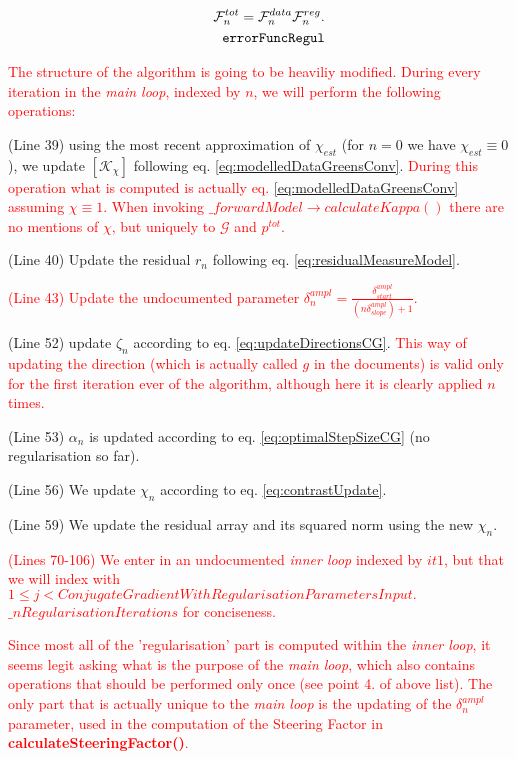 \documentclass[10pt,a4paper]{article}
\begin{document}
\begin{align} \label{eq:errorFuncRegul} \mathcal{F}^{tot}_n =
\mathcal{F}^{data}_n \mathcal{F}^{reg}_n.\\
\tag*{\texttt{errorFuncRegul}}
\end{align}

\textcolor{red}{The structure of the algorithm is going to be heaviliy modified.
During every iteration in the \textit{main loop}, indexed by $n$, we will perform the following operations:}
\begin{enumerate}
\item (Line 39) using the most recent approximation of $\chi_{est} $ (for $n=0$ we have $\chi_{est} \equiv 0$), we update $[\mathcal{K}_\chi]$ following eq. \eqref{eq:modelledDataGreensConv}. 
\textcolor{red}{During this operation what is computed is actually eq. \eqref{eq:modelledDataGreensConv} assuming $\chi \equiv 1$. When invoking $\_forwardModel\rightarrow calculateKappa()$ there are no mentions of $\chi$, but uniquely to $\mathcal{G}$ and $p^{tot}$.
}
\item (Line 40) Update the residual $r_n$ following eq. \eqref{eq:residualMeasureModel}.
\textcolor{red}{\item (Line 43) Update the undocumented parameter $\delta^{ampl}_n = \frac{\delta^{ampl}_{start}}{(n  \delta^{ampl}_{slope}) +1}$.}
\item (Line 52) update $\zeta_n$ according to eq. \eqref{eq:updateDirectionsCG}. 
\textcolor{red}{This way of updating the direction (which is actually called $g$ in the documents) is valid only for the first iteration ever of the algorithm, although here it is clearly applied $n$ times.}
\item (Line 53)  $\alpha_n$ is updated according to eq. \eqref{eq:optimalStepSizeCG} (no regularisation so far).
\item (Line 56) We update $\chi_n$ according to eq. \eqref{eq:contrastUpdate}.
\item (Line 59) We update the residual array and its squared norm using the new $\chi_n$.
\textcolor{red}{\item (Lines 70-106) We enter in an undocumented \textit{inner loop} indexed by $it1$, but that we will index with $1\leq j <  ConjugateGradientWithRegularisationParametersInput.$ $ \_nRegularisationIterations$ for conciseness.}
\end{enumerate}
\textcolor{red}{
Since most all of the 'regularisation' part is computed within the \textit{inner loop}, it seems legit asking what is the purpose of the \textit{main loop}, which also contains operations that should be performed only once (see point 4. of above list).
The only part that is actually unique to the \textit{main loop} is the updating of the $\delta^{ampl}_n$ parameter, used in the computation of the Steering Factor in \textbf{calculateSteeringFactor()}.
}
\end{document}
